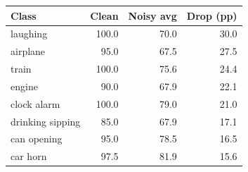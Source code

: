 \begin{tabular}{lrrr}
\toprule
Class & Clean & Noisy avg & Drop (pp) \\
\midrule
laughing & 100.0 & 70.0 & 30.0 \\
airplane & 95.0 & 67.5 & 27.5 \\
train & 100.0 & 75.6 & 24.4 \\
engine & 90.0 & 67.9 & 22.1 \\
clock alarm & 100.0 & 79.0 & 21.0 \\
drinking sipping & 85.0 & 67.9 & 17.1 \\
can opening & 95.0 & 78.5 & 16.5 \\
car horn & 97.5 & 81.9 & 15.6 \\
\bottomrule
\end{tabular}